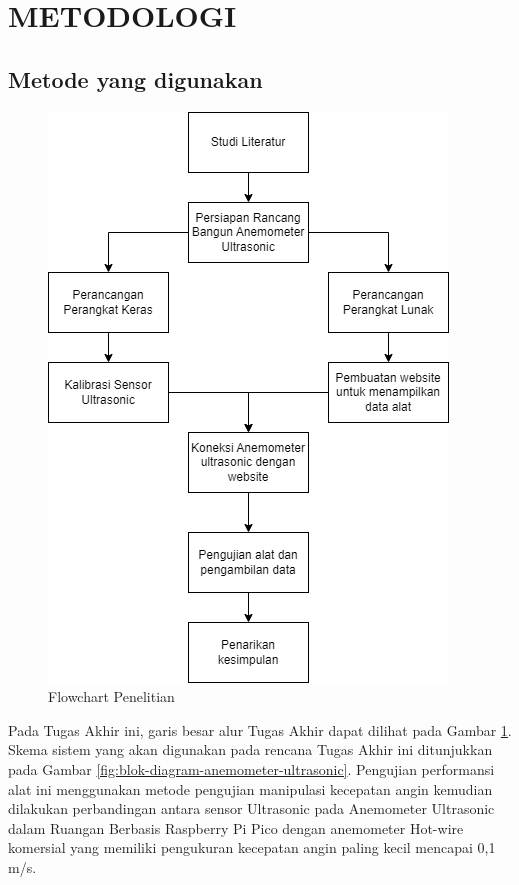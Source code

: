 \section{METODOLOGI}


\subsection{Metode yang digunakan}

\begin{figure}[h!]
	\centering
	\includegraphics[width=0.7\linewidth]{"gambar/Flowchart penelitian.drawio"}
	\caption{Flowchart Penelitian}
	\label{fig:flowchart-penelitian}
\end{figure}

Pada Tugas Akhir ini, garis besar alur Tugas Akhir dapat dilihat pada Gambar \ref*{fig:flowchart-penelitian}.
Skema sistem yang akan digunakan pada rencana Tugas Akhir ini ditunjukkan pada Gambar \ref*{fig:blok-diagram-anemometer-ultrasonic}. 
Pengujian performansi alat ini menggunakan metode pengujian manipulasi kecepatan angin kemudian dilakukan perbandingan 
antara sensor Ultrasonic pada Anemometer Ultrasonic dalam Ruangan Berbasis Raspberry Pi Pico dengan anemometer Hot-wire komersial yang
 memiliki pengukuran kecepatan angin paling kecil mencapai 0,1 m/s.

